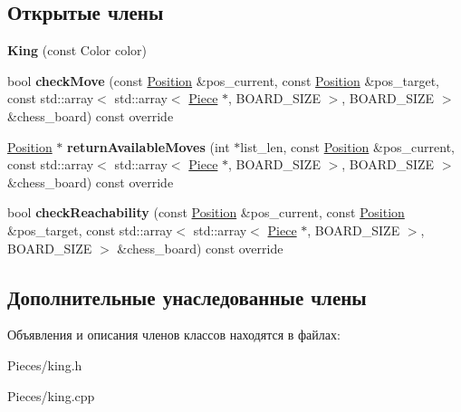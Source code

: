 \subsection*{Открытые члены}
\begin{DoxyCompactItemize}
\item 
\mbox{\label{class_chess_1_1_king_a66db2fe8f54a001bd181591cdccba958}} 
{\bfseries King} (const Color color)
\item 
\mbox{\label{class_chess_1_1_king_a2a99eca45d27801a80eaded7aee690cb}} 
bool {\bfseries check\+Move} (const \mbox{\hyperlink{class_chess_1_1_position}{Position}} \&pos\+\_\+current, const \mbox{\hyperlink{class_chess_1_1_position}{Position}} \&pos\+\_\+target, const std\+::array$<$ std\+::array$<$ \mbox{\hyperlink{class_chess_1_1_piece}{Piece}} $\ast$, B\+O\+A\+R\+D\+\_\+\+S\+I\+ZE $>$, B\+O\+A\+R\+D\+\_\+\+S\+I\+ZE $>$ \&chess\+\_\+board) const override
\item 
\mbox{\label{class_chess_1_1_king_a07ef876e1c3196200042cacccfd33cbb}} 
\mbox{\hyperlink{class_chess_1_1_position}{Position}} $\ast$ {\bfseries return\+Available\+Moves} (int $\ast$list\+\_\+len, const \mbox{\hyperlink{class_chess_1_1_position}{Position}} \&pos\+\_\+current, const std\+::array$<$ std\+::array$<$ \mbox{\hyperlink{class_chess_1_1_piece}{Piece}} $\ast$, B\+O\+A\+R\+D\+\_\+\+S\+I\+ZE $>$, B\+O\+A\+R\+D\+\_\+\+S\+I\+ZE $>$ \&chess\+\_\+board) const override
\item 
\mbox{\label{class_chess_1_1_king_a986c2dd316a9daec8714a773fa575d79}} 
bool {\bfseries check\+Reachability} (const \mbox{\hyperlink{class_chess_1_1_position}{Position}} \&pos\+\_\+current, const \mbox{\hyperlink{class_chess_1_1_position}{Position}} \&pos\+\_\+target, const std\+::array$<$ std\+::array$<$ \mbox{\hyperlink{class_chess_1_1_piece}{Piece}} $\ast$, B\+O\+A\+R\+D\+\_\+\+S\+I\+ZE $>$, B\+O\+A\+R\+D\+\_\+\+S\+I\+ZE $>$ \&chess\+\_\+board) const override
\end{DoxyCompactItemize}
\subsection*{Дополнительные унаследованные члены}


Объявления и описания членов классов находятся в файлах\+:\begin{DoxyCompactItemize}
\item 
Pieces/king.\+h\item 
Pieces/king.\+cpp\end{DoxyCompactItemize}
